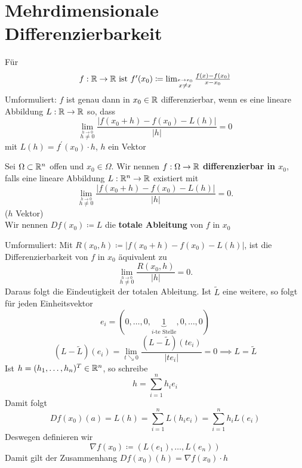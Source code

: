\section{Mehrdimensionale Differenzierbarkeit}
Für
\[
	f : \R \to \R  $ ist $ f^\prime (x_0) \coloneqq \lim_{\overset{x \to x_0}{x \neq x}} \frac{ f(x) - f(x_0) }{ x - x_0 }
\]
Umformuliert: $ f $ ist genau dann in $ x_0 \in \mathbb{R}  $ differenzierbar, wenn es eine lineare Abbildung $ L : \mathbb{R} \to \mathbb{R}  $ so, dass
\[
	\lim_{\overset{h \to 0}{h \neq 0}} \frac{ \left| f (x_0 + h) - f(x_0) - L(h) \right| }{ \left| h \right|  } = 0
\]
mit $ L(h) = f^\prime (x_0) \cdot h $, $  h $ ein Vektor

\begin{definition}[Differenzierbarkeit]
	Sei $ \Omega \subset \mathbb{R} ^n $ offen und $ x_0 \in \Omega $.
	Wir nennen $ f: \Omega \to \mathbb{R} $ \textbf{differenzierbar in $ x_0 $}, falls eine lineare Abbildung $ L : \mathbb{R} ^n \to \mathbb{R}  $ existiert mit
	\[
		\lim_{\overset{h \to 0}{h \neq 0}} \frac{ \left| f(x_0 + h) - f(x_0) - L(h) \right| }{ \left| h \right|  } = 0.
	\]
	($ h $ Vektor)\\
	Wir nennen $ D f(x_0) \coloneqq L $ die \textbf{totale Ableitung} von $ f $ in $ x_0 $

	Umformuliert: Mit $ R(x_0, h) \coloneqq \left| f(x_0 + h) - f(x_0) - L(h) \right|  $, ist die Differenzierbarkeit von $ f $ in $ x_0 $ äquivalent zu
	\[
		\lim_{\overset{h \to 0}{h \neq 0}} \frac{ R(x_0, h) }{ \left| h \right|  } = 0.
	\]
	Daraus folgt die Eindeutigkeit der totalen Ableitung.
	Ist $ \tilde L $ eine weitere, so folgt für jeden Einheitsvektor
	\[
		e_i = ( 0, \dotsc, 0, \underbrace{1}_{i\text{-te Stelle} }, 0, \dotsc, 0)
	\]
	\[
		(L - \tilde L) (e_i) = \lim_{t \searrow 0} \frac{( L - \tilde L )(t e_i) }{ \left| t e_i \right|  } = 0 \implies L = \tilde L
	\]
	Ist $ h = (h_1, \dotsc, h_n)^T \in \mathbb{R} ^n $, so schreibe 
	\[
		h = \sum_{i=1}^{n} h_i e_i
	\]
	Damit folgt
	\[
		D f(x_0) (a) = L(h) = \sum_{i=1}^{n} L(h_i e_i) = \sum_{i=1}^{n} h_i L(e_i)
	\]
	Deswegen definieren wir
	\[
		\nabla f(x_0) \coloneqq \left( L(e_1) , \dotsc, L(e_n) \right) 
	\]
	Damit gilt der Zusammenhang $ D f(x_0) (h) = \nabla f(x_0) \cdot h $
\end{definition}


